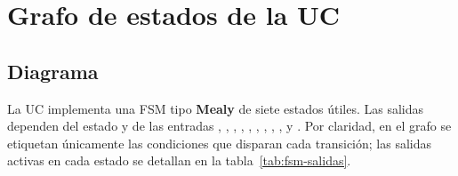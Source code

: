 \section{Grafo de estados de la UC}
\label{sec:grafo}

\subsection{Diagrama}

La UC implementa una FSM tipo \textbf{Mealy} de siete estados \'utiles. Las salidas
dependen del estado y de las entradas , , , ,
, , , ,
,  y . Por claridad, en el grafo
se etiquetan \'unicamente las condiciones que disparan cada transici\'on; las salidas
activas en cada estado se detallan en la tabla~\ref{tab:fsm-salidas}.

